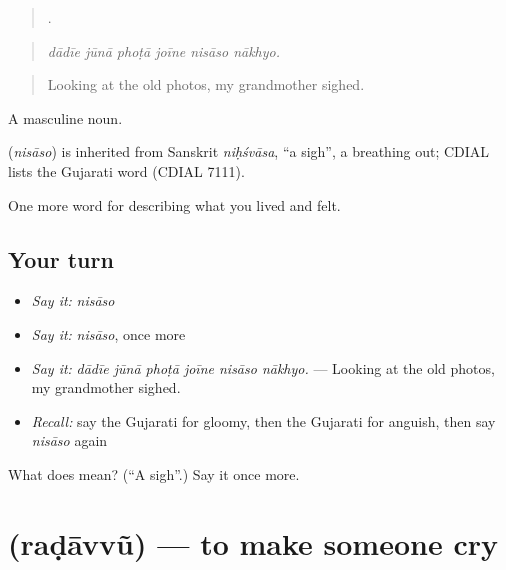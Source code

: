 \begin{quote}
     .
\end{quote}

\begin{quote}
\emph{dādīe jūnā phoṭā joīne nisāso nākhyo.}
\end{quote}

\begin{quote}
Looking at the old photos, my grandmother sighed.
\end{quote}

A masculine noun.

\begin{cousinweb}
\textbf{} (\emph{nisāso}) is inherited from Sanskrit \emph{niḥśvāsa}, \textquotedblleft{}a sigh\textquotedblright{}, a breathing out; CDIAL lists the Gujarati word (CDIAL 7111).
\end{cousinweb}

\begin{grammarlens}[title={What you've built}]
One more word for describing what you lived and felt.
\end{grammarlens}

\subsection*{Your turn}
\begin{itemize}
\raggedright
  \item \emph{Say it:} \emph{nisāso}
  \item \emph{Say it:} \emph{nisāso}, once more
  \item \emph{Say it:} \emph{dādīe jūnā phoṭā joīne nisāso nākhyo.} — Looking at the old photos, my grandmother sighed.
  \item \emph{Recall:} say the Gujarati for gloomy, then the Gujarati for anguish, then say \emph{nisāso} again
\end{itemize}

\begin{tcolorbox}[breakable,colback=teal!4,colframe=teal!35!black,title={Before you move on}]
What does  mean? (\textquotedblleft{}A sigh\textquotedblright{}.) Say it once more.
\end{tcolorbox}
\section[\texorpdfstring{\gu{રડાવવું} (raḍāvvũ)}{રડાવવું (raḍāvvũ)}]{ (raḍāvvũ) — to make someone cry}

